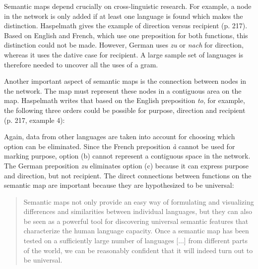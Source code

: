 Semantic maps depend crucially on cross-linguistic research. For example, a node in the network is only added if at least one language is found which makes the distinction. Haspelmath gives the example of direction versus recipient (p. 217). Based on English and French, which use one preposition for
both functions, this distinction could not be made. However, German uses {\em zu} or {\em nach} for direction, whereas it uses the dative case for recipient. A large sample set of languages is therefore needed to uncover all the uses of a gram.

Another important aspect of semantic maps is the connection between nodes in the network. The map must represent these nodes in a contiguous area on the map. Haspelmath writes that based on the English preposition {\em to}, for example, the following three orders could be possible for purpose, direction and recipient (p. 217, example 4):

\eal
{}
\zl

Again, data from other languages are taken into account for choosing which option can be eliminated. Since the French preposition {\em à} cannot be used for marking purpose, option (b) cannot represent a contiguous space in the network. The German preposition {\em zu} eliminates option (c) because it can express purpose and direction, but not recipient. The direct connections between functions on the semantic map are important because they are hypothesized to be universal:

\begin{quote}
Semantic maps not only provide an easy way of formulating and visualizing differences and similarities between individual languages, but they can also be seen as a powerful tool for discovering universal semantic features that characterize the human language capacity. Once a semantic map has been tested on a sufficiently large number of languages [...] from different parts of the world, we can be reasonably confident that it will indeed turn out to be universal. \citep[232]{haspelmath03geometry} 
\end{quote}

